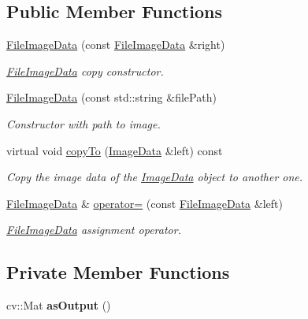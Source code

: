 \subsection*{Public Member Functions}
\begin{DoxyCompactItemize}
\item 
\hyperlink{classfilter_1_1data_1_1_file_image_data_aa49f9012959f0f8f8c1826be3a31fdf6}{File\+Image\+Data} (const \hyperlink{classfilter_1_1data_1_1_file_image_data}{File\+Image\+Data} \&right)
\begin{DoxyCompactList}\small\item\em \hyperlink{classfilter_1_1data_1_1_file_image_data}{File\+Image\+Data} copy constructor. \end{DoxyCompactList}\item 
\hyperlink{classfilter_1_1data_1_1_file_image_data_ad5fb185db36ade62bc5eb46d30b938a1}{File\+Image\+Data} (const std\+::string \&file\+Path)
\begin{DoxyCompactList}\small\item\em Constructor with path to image. \end{DoxyCompactList}\item 
virtual void \hyperlink{classfilter_1_1data_1_1_file_image_data_a188f2f5ab66877f6ba553cc847cd5f07}{copy\+To} (\hyperlink{classfilter_1_1data_1_1_image_data}{Image\+Data} \&left) const
\begin{DoxyCompactList}\small\item\em Copy the image data of the \hyperlink{classfilter_1_1data_1_1_image_data}{Image\+Data} object to another one. \end{DoxyCompactList}\item 
\hyperlink{classfilter_1_1data_1_1_file_image_data}{File\+Image\+Data} \& \hyperlink{classfilter_1_1data_1_1_file_image_data_abd280bc0cc3d1a1e6aa1924041a71820}{operator=} (const \hyperlink{classfilter_1_1data_1_1_file_image_data}{File\+Image\+Data} \&left)
\begin{DoxyCompactList}\small\item\em \hyperlink{classfilter_1_1data_1_1_file_image_data}{File\+Image\+Data} assignment operator. \end{DoxyCompactList}\end{DoxyCompactItemize}
\subsection*{Private Member Functions}
\begin{DoxyCompactItemize}
\item 
\mbox{\label{classfilter_1_1data_1_1_file_image_data_aef2ffb7b62f14ba6312bbb21167b13f3}} 
cv\+::\+Mat {\bfseries as\+Output} ()
\end{DoxyCompactItemize}
